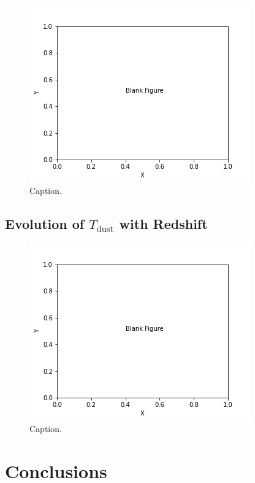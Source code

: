\begin{figure}
	\centering
	\includegraphics[width=0.75\columnwidth]{Figures/blank_figure.png}
	\caption{Caption.}
	\label{fig:beta_z_evolution}
\end{figure}

\subsection{Evolution of $T_{\textrm{dust}}$ with Redshift}

\begin{figure}
	\centering
	\includegraphics[width=0.75\columnwidth]{Figures/blank_figure.png}
	\caption{Caption.}
	\label{fig:t_z_evolution}
\end{figure}

\section{Conclusions}